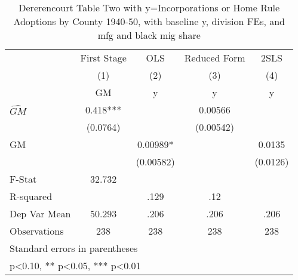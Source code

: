 \begin{table}[htbp]\centering
\def\sym#1{\ifmmode^{#1}\else\(^{#1}\)\fi}
\caption{Dererencourt Table Two with y=Incorporations or Home Rule Adoptions by County 1940-50, with baseline y, division FEs, and mfg and black mig share}
\begin{tabular}{l*{4}{c}}
\toprule
                    & First Stage   &         OLS   &Reduced Form   &        2SLS   \\
                    &\multicolumn{1}{c}{(1)}&\multicolumn{1}{c}{(2)}&\multicolumn{1}{c}{(3)}&\multicolumn{1}{c}{(4)}\\
                    &\multicolumn{1}{c}{GM}&\multicolumn{1}{c}{y}&\multicolumn{1}{c}{y}&\multicolumn{1}{c}{y}\\
\midrule
$\hat{GM}$          &       0.418***&               &     0.00566   &               \\
                    &    (0.0764)   &               &   (0.00542)   &               \\
\addlinespace
GM                  &               &     0.00989*  &               &      0.0135   \\
                    &               &   (0.00582)   &               &    (0.0126)   \\
\midrule
F-Stat              &      32.732   &               &               &               \\
R-squared           &               &        .129   &         .12   &               \\
Dep Var Mean        &      50.293   &        .206   &        .206   &        .206   \\
Observations        &         238   &         238   &         238   &         238   \\
\bottomrule
\multicolumn{5}{l}{\footnotesize Standard errors in parentheses}\\
\multicolumn{5}{l}{\footnotesize * p<0.10, ** p<0.05, *** p<0.01}\\
\end{tabular}
\end{table}
